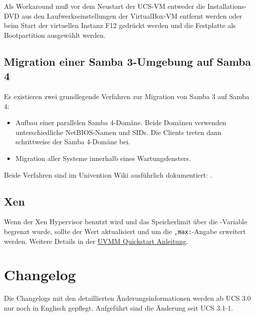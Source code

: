 Als Workaround muß vor dem Neustart der UCS-VM entweder die
Installations-DVD aus den Laufwerkseinstellungen der VirtualBox-VM
entfernt werden oder beim Start der virtuellen Instanz F12 gedrückt
werden und die Festplatte als Bootpartition ausgewählt werden.

\section{Migration einer Samba 3-Umgebung auf Samba 4}
\label{samba-migration}

Es existieren zwei grundlegende Verfahren zur Migration von Samba 3 auf Samba
4:

\begin{itemize}
\item Aufbau einer parallelen Samba 4-Domäne. Beide Domänen verwenden
unterschiedliche NetBIOS-Namen und SIDs. Die Clients treten dann schrittweise
der Samba 4-Domäne bei.
\item Migration aller Systeme innerhalb eines Wartungsfensters.
\end{itemize}

Beide Verfahren sind im Univention Wiki ausführlich dokumentiert:
.

\section{Xen} %
Wenn der Xen Hypervisor benutzt wird und das Speicherlimit über die \ucsUCR{}-Variable  begrenzt wurde, sollte der Wert aktualisiert und um die \texttt{,max:}-Angabe erweitert werden.
Weitere Details in der \href{http://wiki.univention.de/index.php?title=UVMM_Quickstart-3.1#Konfiguration_der_Dom0}{UVMM Quickstart Anleitung}.

\chapter{Changelog}

Die Changelogs mit den detaillierten Änderungsinformationen werden ab UCS 3.0
nur noch in Englisch gepflegt. Aufgeführt sind die Änderung seit UCS 3.1-1.

